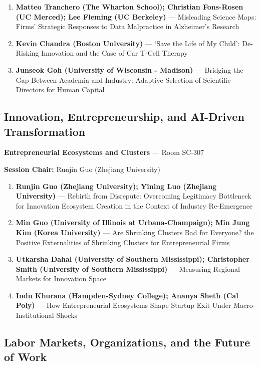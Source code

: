\documentclass[
  10pt,
  letterpaper,
  DIV=11,
  numbers=noendperiod]{scrartcl}
\begin{document}
\begin{enumerate}
\def\labelenumi{\arabic{enumi}.}
\item
  \textbf{Matteo Tranchero (The Wharton School); Christian Fons-Rosen
  (UC Merced); Lee Fleming (UC Berkeley)} --- Misleading Science Maps:
  Firms' Strategic Responses to Data Malpractice in Alzheimer's Research
\item
  \textbf{Kevin Chandra (Boston University)} --- `Save the Life of My
  Child': De-Risking Innovation and the Case of Car T-Cell Therapy
\item
  \textbf{Junseok Goh (University of Wisconsin - Madison)} --- Bridging
  the Gap Between Academia and Industry: Adaptive Selection of
  Scientific Directors for Human Capital
\end{enumerate}

\subsection{\texorpdfstring{\textcolor{innovation}{Innovation, Entrepreneurship, and AI-Driven Transformation}}{}}\label{section-23}

\textbf{Entrepreneurial Ecosystems and Clusters} --- Room SC-307

\textbf{Session Chair:} Runjin Guo (Zhejiang University)

\begin{enumerate}
\def\labelenumi{\arabic{enumi}.}
\item
  \textbf{Runjin Guo (Zhejiang University); Yining Luo (Zhejiang
  University)} --- Rebirth from Disrepute: Overcoming Legitimacy
  Bottleneck for Innovation Ecosystem Creation in the Context of
  Industry Re-Emergence
\item
  \textbf{Min Guo (University of Illinois at Urbana-Champaign); Min Jung
  Kim (Korea University)} --- Are Shrinking Clusters Bad for Everyone?
  the Positive Externalities of Shrinking Clusters for Entrepreneurial
  Firms
\item
  \textbf{Utkarsha Dahal (University of Southern Mississippi);
  Christopher Smith (University of Southern Mississippi)} --- Measuring
  Regional Markets for Innovation Space
\item
  \textbf{Indu Khurana (Hampden-Sydney College); Ananya Sheth (Cal
  Poly)} --- How Entrepreneurial Ecosystems Shape Startup Exit Under
  Macro-Institutional Shocks
\end{enumerate}

\subsection{\texorpdfstring{\textcolor{labor}{Labor Markets, Organizations, and the Future of Work}}{}}\label{section-24}
\end{document}
